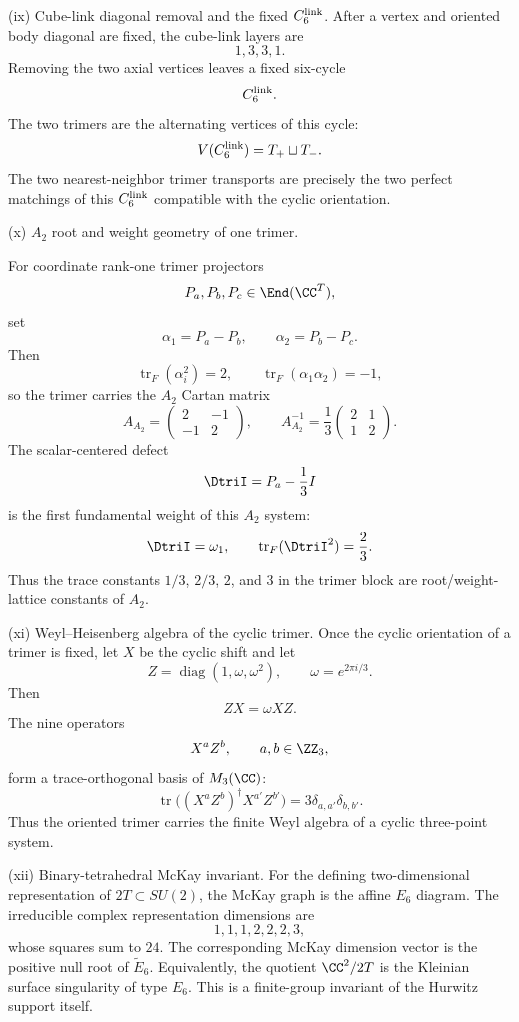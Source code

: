 \documentclass[11pt]{article}
\begin{document}
\begin{theorem}
\smallskip
\noindent\textup{(ix) Cube-link diagonal removal and the fixed
\(C_6^{\rm link}\).}
After a vertex and oriented body diagonal are fixed, the cube-link layers are
\[
    1,3,3,1.
\]
Removing the two axial vertices leaves a fixed six-cycle
\[
    C_6^{\rm link}.
\]
The two trimers are the alternating vertices of this cycle:
\[
    V(C_6^{\rm link})=T_+\sqcup T_-.
\]
The two nearest-neighbor trimer transports are precisely the two perfect
matchings of this \(C_6^{\rm link}\) compatible with the cyclic orientation.

\smallskip
\noindent\textup{(x) \(A_2\) root and weight geometry of one trimer.}
\par\noindent
For coordinate rank-one trimer projectors
\[
    P_a,P_b,P_c\in\End(\CC^T),
\]
set
\[
    \alpha_1=P_a-P_b,
    \qquad
    \alpha_2=P_b-P_c.
\]
Then
\[
    \operatorname{tr}_F(\alpha_i^2)=2,
    \qquad
    \operatorname{tr}_F(\alpha_1\alpha_2)=-1,
\]
so the trimer carries the \(A_2\) Cartan matrix
\[
    A_{A_2}=\begin{pmatrix}2&-1\\-1&2\end{pmatrix},
    \qquad
    A_{A_2}^{-1}=\frac13\begin{pmatrix}2&1\\1&2\end{pmatrix}.
\]
The scalar-centered defect
\[
    \DtriI=P_a-\frac13 I
\]
is the first fundamental weight of this \(A_2\) system:
\[
    \DtriI=\omega_1,
    \qquad
    \operatorname{tr}_F({\DtriI}^2)=\frac23.
\]
Thus the trace constants \(1/3\), \(2/3\), \(2\), and \(3\) in the trimer block
are root/weight-lattice constants of \(A_2\).

\smallskip
\noindent\textup{(xi) Weyl--Heisenberg algebra of the cyclic trimer.}
Once the cyclic orientation of a trimer is fixed, let \(X\) be the cyclic shift
and let
\[
    Z=\operatorname{diag}(1,\omega,\omega^2),
    \qquad
    \omega=e^{2\pi i/3}.
\]
Then
\[
    ZX=\omega XZ.
\]
The nine operators
\[
    X^aZ^b,
    \qquad
    a,b\in\ZZ_3,
\]
form a trace-orthogonal basis of \(M_3(\CC)\):
\[
    \operatorname{tr}\bigl((X^aZ^b)^\dagger X^{a'}Z^{b'}\bigr)
    =3\delta_{a,a'}\delta_{b,b'}.
\]
Thus the oriented trimer carries the finite Weyl algebra of a cyclic
three-point system.

\smallskip
\noindent\textup{(xii) Binary-tetrahedral McKay invariant.}
For the defining two-dimensional representation of \(2T\subset SU(2)\), the
McKay graph is the affine \(E_6\) diagram.  The irreducible complex
representation dimensions are
\[
    1,1,1,2,2,2,3,
\]
whose squares sum to \(24\).  The corresponding McKay dimension vector is the
positive null root of \(\widetilde E_6\).  Equivalently, the quotient
\(\CC^2/2T\) is the Kleinian surface singularity of type \(E_6\).  This is a
finite-group invariant of the Hurwitz support itself.


\end{theorem}
\end{document}
